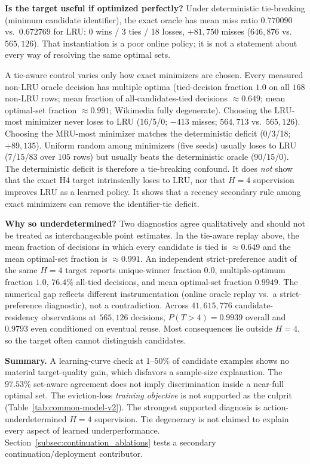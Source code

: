 \documentclass[preprint,12pt]{elsarticle}
\begin{document}
\textbf{Is the target useful if optimized perfectly?} Under deterministic tie-breaking (minimum candidate identifier), the exact oracle has mean miss ratio $0.770090$ vs.\ $0.672769$ for LRU: 0 wins / 3 ties / 18 losses, $+81{,}750$ misses ($646{,}876$ vs.\ $565{,}126$). That instantiation is a poor online policy; it is not a statement about every way of resolving the same optimal sets.

A tie-aware control varies only how exact minimizers are chosen. Every measured non-LRU oracle decision has multiple optima (tied-decision fraction $1.0$ on all $168$ non-LRU rows; mean fraction of all-candidates-tied decisions $\approx 0.649$; mean optimal-set fraction $\approx 0.991$; Wikimedia fully degenerate). Choosing the LRU-most minimizer never loses to LRU (16/5/0; $-413$ misses; $564{,}713$ vs.\ $565{,}126$). Choosing the MRU-most minimizer matches the deterministic deficit (0/3/18; $+89{,}135$). Uniform random among minimizers (five seeds) usually loses to LRU (7/15/83 over $105$ rows) but usually beats the deterministic oracle (90/15/0). The deterministic deficit is therefore a tie-breaking confound. It does \emph{not} show that the exact H4 target intrinsically loses to LRU, nor that $H=4$ supervision improves LRU as a learned policy. It shows that a recency secondary rule among exact minimizers can remove the identifier-tie deficit.

\textbf{Why so underdetermined?} Two diagnostics agree qualitatively and should not be treated as interchangeable point estimates. In the tie-aware replay above, the mean fraction of decisions in which every candidate is tied is $\approx 0.649$ and the mean optimal-set fraction is $\approx 0.991$. An independent strict-preference audit of the same $H=4$ target reports unique-winner fraction $0.0$, multiple-optimum fraction $1.0$, $76.4\%$ all-tied decisions, and mean optimal-set fraction $0.9949$. The numerical gap reflects different instrumentation (online oracle replay vs.\ a strict-preference diagnostic), not a contradiction. Across $41{,}615{,}776$ candidate-residency observations at $565{,}126$ decisions, $P(T>4)=0.9939$ overall and $0.9793$ even conditioned on eventual reuse. Most consequences lie outside $H=4$, so the target often cannot distinguish candidates.

\textbf{Summary.} A learning-curve check at $1$--$50\%$ of candidate examples shows no material target-quality gain, which disfavors a sample-size explanation. The $97.53\%$ set-aware agreement does not imply discrimination inside a near-full optimal set. The eviction-loss \emph{training objective} is not supported as the culprit (Table~\ref{tab:common-model-v2}). The strongest supported diagnosis is action-underdetermined $H=4$ supervision. Tie degeneracy is not claimed to explain every aspect of learned underperformance. Section~\ref{subsec:continuation_ablations} tests a secondary continuation/deployment contributor.
\end{document}
